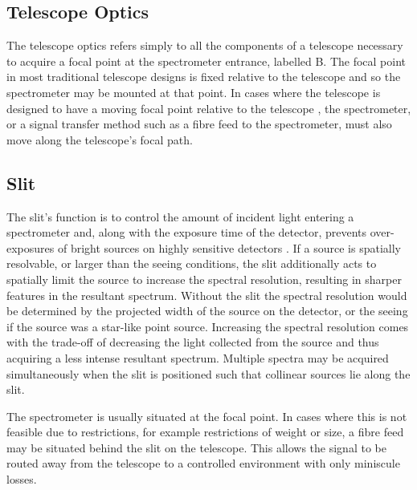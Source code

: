 \subsection{Telescope Optics}

The telescope optics refers simply to all the components of a telescope necessary to acquire a focal point at the spectrometer entrance, labelled B. The focal point in most traditional telescope designs is fixed relative to the telescope and so the spectrometer may be mounted at that point. In cases where the telescope is designed to have a moving focal point relative to the telescope \cite[see][]{Arecibo, HET, SALT_design}, the spectrometer, or a signal transfer method such as a fibre feed to the spectrometer, must also move along the telescope's focal path.

\subsection{Slit}

The slit's function is to control the amount of incident light entering a spectrometer and, along with the exposure time of the detector, prevents over-exposures of bright sources on highly sensitive detectors \citep{TonkPracAmSpec}. If a source is spatially resolvable, or larger than the seeing conditions, the slit additionally acts to spatially limit the source to increase the spectral resolution, resulting in sharper features in the resultant spectrum. Without the slit the spectral resolution would be determined by the projected width of the source on the detector, or the seeing if the source was a star-like point source. Increasing the spectral resolution comes with the trade-off of decreasing the light collected from the source and thus acquiring a less intense resultant spectrum. Multiple spectra may be acquired simultaneously when the slit is positioned such that collinear sources lie along the slit.

The spectrometer is usually situated at the focal point. In cases where this is not feasible due to restrictions, for example restrictions of weight or size, a fibre feed may be situated behind the slit on the telescope. This allows the signal to be routed away from the telescope to a controlled environment with only miniscule losses.


